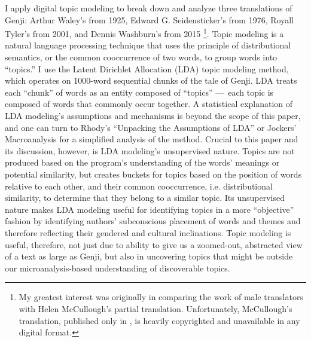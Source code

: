 \documentclass[12pt]{article}
\begin{document}
\begin{flushleft}
\begin{spacing}{2.0}
I apply digital topic modeling to break down and analyze three translations of Genji: Arthur Waley's from 1925, Edward G. Seidensticker's from 1976, Royall Tyler's from 2001, and Dennis Washburn's from 2015 \footnote{ My greatest interest was originally in comparing the work of male translators with Helen McCullough's partial translation. Unfortunately, McCullough's translation, published only in , is heavily copyrighted and unavailable in any digital format.}. Topic modeling is a natural language processing technique that uses the principle of distributional semantics, or the common cooccurrence of two words, to group words into ``topics.'' I use the Latent Dirichlet Allocation (LDA) topic modeling method, which operates on 1000-word sequential chunks of the tale of Genji. LDA treats each ``chunk'' of words as an entity composed of ``topics'' --- each topic is composed of words that commonly occur together. A statistical explanation of LDA modeling's assumptions and mechanisms is beyond the scope of this paper, and one can turn to Rhody's ``Unpacking the Assumptions of LDA'' or Jockers' Macroanalysis for a simplified analysis of the method. Crucial to this paper and its discussion, however, is LDA modeling's unsupervised nature. Topics are not produced based on the program's understanding of the words' meanings or potential similarity, but creates buckets for topics based on the position of words relative to each other, and their common cooccurrence, i.e. distributional similarity, to determine that they belong to a similar topic. Its unsupervised nature makes LDA modeling useful for identifying topics in a more ``objective'' fashion by identifying authors' subconscious placement of words and themes and therefore reflecting their gendered and cultural inclinations. Topic modeling is useful, therefore, not just due to ability to give us a zoomed-out, abstracted view of a text as large as Genji, but also in uncovering topics that might be outside our microanalysis-based understanding of discoverable topics.


\end{spacing}
\end{flushleft}
\end{document}
